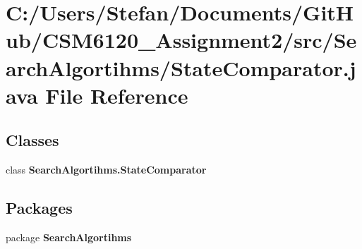 \section{C\+:/\+Users/\+Stefan/\+Documents/\+Git\+Hub/\+C\+S\+M6120\+\_\+\+Assignment2/src/\+Search\+Algortihms/\+State\+Comparator.java File Reference}
\label{_state_comparator_8java}
\subsection*{Classes}
\begin{DoxyCompactItemize}
\item 
class {\bf Search\+Algortihms.\+State\+Comparator}
\end{DoxyCompactItemize}
\subsection*{Packages}
\begin{DoxyCompactItemize}
\item 
package {\bf Search\+Algortihms}
\end{DoxyCompactItemize}
